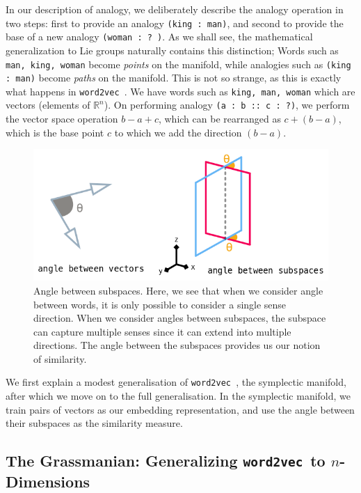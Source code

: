 \documentclass[11pt]{book}
\newcommand{\wtov}{\texttt{word2vec }}
\newcommand{\R}{\ensuremath{\mathbb R}}
\begin{document}
In our description of analogy, we deliberately describe the analogy operation
in two steps: first to provide an analogy \texttt{(king : man)}, and second
to provide the base of a new analogy \texttt{(woman : ? )}. As we shall see,
the mathematical generalization to Lie groups naturally contains this distinction;
Words such as \texttt{man, king, woman} become \emph{points} on the manifold,
while analogies such as \texttt{(king : man)} become \emph{paths} on the manifold.
This is not so strange, as this is exactly what happens in \wtov. We have
words such as \texttt{king, man, woman} which are vectors (elements of $\R^n$). 
On performing analogy \texttt{(a : b :: c : ?)}, we perform the vector
space operation $b - a + c$, which can be rearranged as $c + (b - a)$, which
is the base point $c$ to which we add the direction $(b - a)$.

\begin{figure}[H]
\includegraphics[width=\textwidth]{./symplectic.png}
\caption{Angle between subspaces. Here, we see that when we consider angle
 between words, it is only possible to consider a single sense direction. When
 we consider angles between subspaces, the subspace can capture multiple senses
 since it can extend into multiple directions.  The angle between the subspaces
 provides us our notion of similarity.}
\end{figure}

We first explain a modest generalisation of \wtov, the symplectic manifold,
after which we move on to the full generalisation. In the symplectic manifold,
we train pairs of vectors as our embedding representation, and use the
angle between their subspaces as the similarity measure.

\subsection{The Grassmanian: Generalizing \wtov to $n$-Dimensions}
\end{document}
